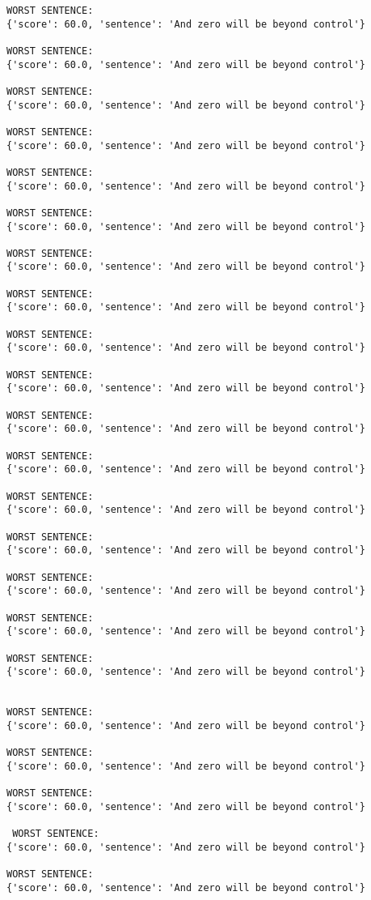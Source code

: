 \documentclass[12pt,a4paper,oneside]{book}
\begin{document}
\begin{verbatim}
WORST SENTENCE:
{'score': 60.0, 'sentence': 'And zero will be beyond control'}

WORST SENTENCE:
{'score': 60.0, 'sentence': 'And zero will be beyond control'}

WORST SENTENCE:
{'score': 60.0, 'sentence': 'And zero will be beyond control'}

WORST SENTENCE:
{'score': 60.0, 'sentence': 'And zero will be beyond control'}

WORST SENTENCE:
{'score': 60.0, 'sentence': 'And zero will be beyond control'}

WORST SENTENCE:
{'score': 60.0, 'sentence': 'And zero will be beyond control'}

WORST SENTENCE:
{'score': 60.0, 'sentence': 'And zero will be beyond control'}

WORST SENTENCE:
{'score': 60.0, 'sentence': 'And zero will be beyond control'}

WORST SENTENCE:
{'score': 60.0, 'sentence': 'And zero will be beyond control'}

WORST SENTENCE:
{'score': 60.0, 'sentence': 'And zero will be beyond control'}

WORST SENTENCE:
{'score': 60.0, 'sentence': 'And zero will be beyond control'}

WORST SENTENCE:
{'score': 60.0, 'sentence': 'And zero will be beyond control'}

WORST SENTENCE:
{'score': 60.0, 'sentence': 'And zero will be beyond control'}

WORST SENTENCE:
{'score': 60.0, 'sentence': 'And zero will be beyond control'}

WORST SENTENCE:
{'score': 60.0, 'sentence': 'And zero will be beyond control'}

WORST SENTENCE:
{'score': 60.0, 'sentence': 'And zero will be beyond control'}

WORST SENTENCE:
{'score': 60.0, 'sentence': 'And zero will be beyond control'}
 
 
WORST SENTENCE:
{'score': 60.0, 'sentence': 'And zero will be beyond control'}

WORST SENTENCE:
{'score': 60.0, 'sentence': 'And zero will be beyond control'}

WORST SENTENCE:
{'score': 60.0, 'sentence': 'And zero will be beyond control'}

 WORST SENTENCE:
{'score': 60.0, 'sentence': 'And zero will be beyond control'}

WORST SENTENCE:
{'score': 60.0, 'sentence': 'And zero will be beyond control'}


\end{verbatim}
\end{document}
